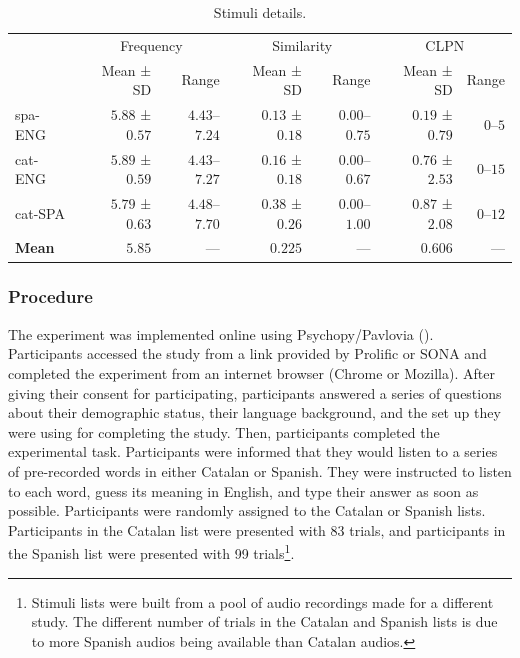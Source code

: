 \documentclass[
]{article}
\begin{document}
\begin{longtable}{l|rrrrrr}

\caption{\label{tbl-stimuli}Stimuli details.}

\tabularnewline

\toprule
\multicolumn{1}{l}{} & \multicolumn{2}{c}{Frequency} & \multicolumn{2}{c}{Similarity} & \multicolumn{2}{c}{CLPN} \\ 
\cmidrule(lr){2-3} \cmidrule(lr){4-5} \cmidrule(lr){6-7}
\multicolumn{1}{l}{} & Mean ± SD & Range & Mean ± SD & Range & Mean ± SD & Range \\ 
\midrule\addlinespace[2.5pt]
spa-ENG & $5.88$ ± $0.57$ & $4.43$–$7.24$ & $0.13$ ± $0.18$ & $0.00$–$0.75$ & $0.19$ ± $0.79$ & $0$–$5$ \\ 
cat-ENG & $5.89$ ± $0.59$ & $4.43$–$7.27$ & $0.16$ ± $0.18$ & $0.00$–$0.67$ & $0.76$ ± $2.53$ & $0$–$15$ \\ 
cat-SPA & $5.79$ ± $0.63$ & $4.48$–$7.70$ & $0.38$ ± $0.26$ & $0.00$–$1.00$ & $0.87$ ± $2.08$ & $0$–$12$ \\ 
\midrule 
\midrule 
\textbf{Mean} & $5.85$ & — & $0.225$ & — & $0.606$ & — \\ 
\bottomrule

\end{longtable}

\subsubsection{Procedure}\label{procedure}

The experiment was implemented online using Psychopy/Pavlovia
(). Participants
accessed the study from a link provided by Prolific or SONA and
completed the experiment from an internet browser (Chrome or Mozilla).
After giving their consent for participating, participants answered a
series of questions about their demographic status, their language
background, and the set up they were using for completing the study.
Then, participants completed the experimental task. Participants were
informed that they would listen to a series of pre-recorded words in
either Catalan or Spanish. They were instructed to listen to each word,
guess its meaning in English, and type their answer as soon as possible.
Participants were randomly assigned to the Catalan or Spanish lists.
Participants in the Catalan list were presented with 83 trials, and
participants in the Spanish list were presented with 99
trials\footnote{Stimuli lists were built from a pool of audio recordings
  made for a different study. The different number of trials in the
  Catalan and Spanish lists is due to more Spanish audios being
  available than Catalan audios.}.
\end{document}
